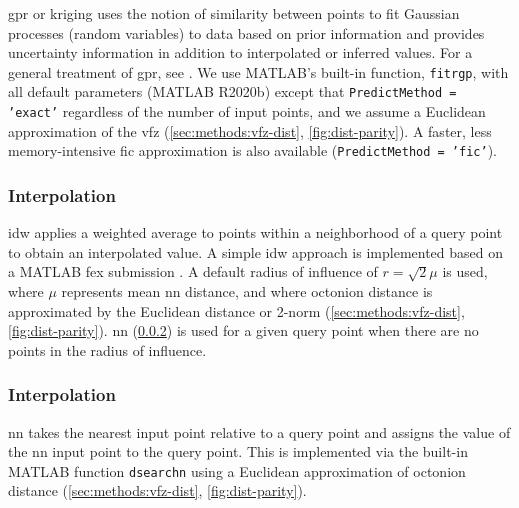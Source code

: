 \documentclass[preprint,12pt]{elsarticle}
\begin{document}
\Gls{gpr} or kriging uses the notion of similarity between points to fit Gaussian processes (random variables) to data based on prior information and provides uncertainty information in addition to interpolated or inferred values. For a general treatment of \gls{gpr}, see \cite{rasmussenGaussianProcessesMachine2006}. We use MATLAB's built-in function, \texttt{fitrgp}, with all default parameters (MATLAB R2020b) except that \texttt{PredictMethod = 'exact'} regardless of the number of input points, and we assume a Euclidean approximation of the \gls{vfz} (\cref{sec:methods:vfz-dist}, \cref{fig:dist-parity}). A faster, less memory-intensive \gls{fic} approximation is also available (\texttt{PredictMethod = 'fic'}).

\subsubsection{ Interpolation}
\label{sec:methods:interp:idw}


\Gls{idw} applies a weighted average to points within a neighborhood of a query point to obtain an interpolated value. A simple \gls{idw} approach is implemented based on a MATLAB \gls{fex} submission \cite{tovarInverseDistanceWeight2020}. A default radius of influence of $r=\sqrt{2} \mu$ is used, where $\mu$ represents mean \gls{nn} distance, and where octonion distance is approximated by the Euclidean distance or 2-norm (\cref{sec:methods:vfz-dist}, \cref{fig:dist-parity}). \gls{nn} (\cref{sec:methods:interp:nn}) is used for a given query point when there are no points in the radius of influence.

\subsubsection{ Interpolation}
\label{sec:methods:interp:nn}


\Gls{nn} takes the nearest input point relative to a query point and assigns the value of the \gls{nn} input point to the query point. This is implemented via the built-in MATLAB function \texttt{dsearchn} using a Euclidean approximation of octonion distance (\cref{sec:methods:vfz-dist}, \cref{fig:dist-parity}).
\end{document}
